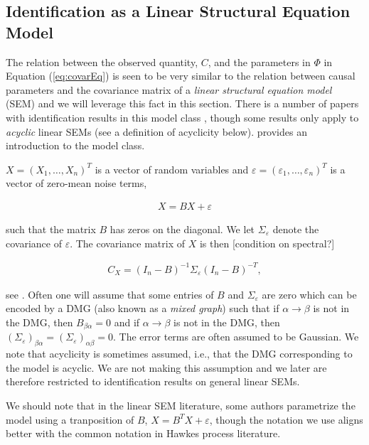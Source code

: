 \documentclass[accepted]{uai2021} %
\begin{document}

\subsection{Identification as a Linear Structural Equation Model}

The relation between the observed quantity, $C$, and the parameters in $\Phi$ 
in 
Equation (\ref{eq:covarEq}) is seen to be very similar to the relation between 
causal parameters and the covariance matrix of a \emph{linear structural 
equation model} (SEM) and we will leverage this fact in this section. There is 
a number of papers with 
identification results in this model class \citep{brito2002, tian2007, 
tian2009, 
foygelHalftrek2012, 
chenNIPS2016, drton2016, 
weihs2018}, though some results only apply to \emph{acyclic} linear SEMs (see a 
definition of acyclicity below). \cite{bollen1989} provides an introduction to 
the model class.

$X = (X_1,\ldots,X_n)^T$ is a vector of random variables and $\varepsilon = 
(\varepsilon_1,\ldots,\varepsilon_n)^T$ is a vector of zero-mean noise terms,

\begin{align}
	X = BX + \varepsilon
	\label{eq:SEM}
\end{align}

such that the matrix $B$ has zeros on the diagonal. We let $\Sigma_\varepsilon$ 
denote the covariance of $\varepsilon$. The 
covariance matrix of $X$ is then [condition on spectral?]

\begin{align}
C_X = (I_n - B)^{-1}\Sigma_\varepsilon (I_n - B)^{-T},
\label{eq:covSEM}
\end{align}

see \cite{hyttinen2012}. Often one will assume that some entries of $B$ and 
$\Sigma_\varepsilon$ are zero which can be encoded by a DMG (also known as a 
\emph{mixed graph}) such that if 
$\alpha \rightarrow \beta$ is not in the DMG, then $B_{\beta\alpha} = 0$ and if 
$\alpha\rightarrow\beta$ is not in the DMG, then 
$(\Sigma_\varepsilon)_{\beta\alpha} = (\Sigma_\varepsilon)_{\alpha\beta} = 0$. 
The 
error terms are often assumed to be Gaussian. We note that acyclicity is 
sometimes assumed, 
i.e., that the DMG corresponding to the model is 
acyclic. 
We are not making 
this assumption and we later are therefore restricted to identification results 
on general linear SEMs.

We should note that in the linear SEM literature, some authors parametrize the 
model using a 
tranposition of $B$, $X = B^TX + \varepsilon$, though the notation we use 
aligns better with the common 
notation 
in Hawkes process literature.
\end{document}
